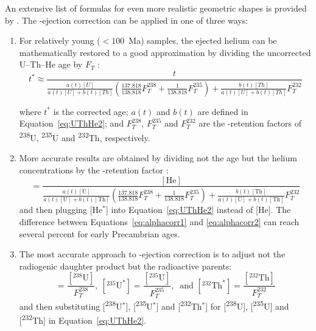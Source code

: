 \begin{refsection}
An extensive list of formulas for even more realistic geometric shapes
is provided by \citet{ketcham2011}. The \textalpha-ejection correction
can be applied in one of three ways:

\begin{enumerate}
\item For relatively young ($<100$~Ma) samples, the ejected helium can
  be mathematically restored to a good approximation by dividing the
  uncorrected U--Th--He age by $F_T$ \citet{farley1996}:
  \begin{equation}
    t^* \approx \frac{t}{
      \frac{a(t)[U]}{a(t)[U]+b(t)[Th]}
      \left(
      \frac{137.818}{138.818} F_T^{238} +
      \frac{1}{138.818} F_T^{235}
      \right) + 
      \frac{b(t)[Th]}{a(t)[U]+b(t)[Th]} F_T^{232}
    }
    \label{eq:alphacorr1}
  \end{equation}

  \noindent where $t^*$ is the corrected age; $a(t)$ and $b(t)$ are
  defined in Equation~\ref{eq:UThHe2}; and $F_T^{238}$, $F_T^{235}$
  and $F_T^{232}$ are the \textalpha-retention factors of
  \textsuperscript{238}U, \textsuperscript{235}U and
  \textsuperscript{232}Th, respectively.
\item More accurate results are obtained by dividing not the age but
  the helium concentrations by the \textalpha-retention factor
  \citep{min2003, vermeesch2008a}:
  \begin{equation}
    [\mbox{He}^*] = \frac{[\mbox{He}]}{
      \frac{a(t)[\mbox{U}]}{a(t)[\mbox{U}]+b(t)[\mbox{Th}]}
      \left(
      \frac{137.818}{138.818} F_T^{238} +
      \frac{1}{138.818} F_T^{235}
      \right) + 
      \frac{b(t)[\mbox{Th}]}{a(t)[\mbox{U}]+b(t)[\mbox{Th}]} F_T^{232}
    }
    \label{eq:alphacorr2}
  \end{equation}
  \noindent and then plugging [He$^*$] into Equation~\ref{eq:UThHe2}
  instead of [He]. The difference between
  Equations~\ref{eq:alphacorr1} and \ref{eq:alphacorr2} can reach
  several percent for early Precambrian ages.
\item The most accurate approach to \textalpha-ejection correction is to
  adjust not the radiogenic daughter product but the radioactive
  parents:
  \begin{equation}
      [{}^{238}\mbox{U}^*] = \frac{[{}^{238}\mbox{U}]}{F_T^{238}},~
      [{}^{235}\mbox{U}^*] = \frac{[{}^{235}\mbox{U}]}{F_T^{235}},~
      \mbox{~and~} [{}^{232}\mbox{Th}^*] =
      \frac{[{}^{232}\mbox{Th}]}{F_T^{232}}
    \label{eq:alphacorr3}
  \end{equation}
  \noindent and then substituting [\textsuperscript{238}U$^*$],
            [\textsuperscript{235}U$^*$] and [\textsuperscript{232}Th$^*$]
            for [\textsuperscript{238}U], [\textsuperscript{235}U] and
            [\textsuperscript{232}Th] in Equation~\ref{eq:UThHe2}.
\end{enumerate}


\end{refsection}
